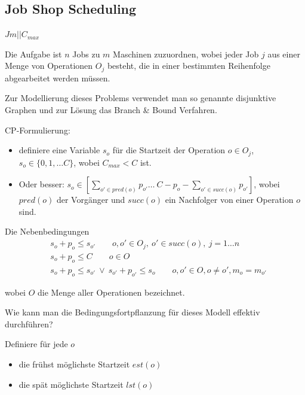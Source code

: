 \documentclass[hyperref={pdfpagelabels=false}]{beamer}
\begin{document}
\subsection{Job Shop Scheduling}
\begin{frame}[allowframebreaks]{$Jm||C_{max}$}
\nocite{CSP}
\small 

\vspace{40pt}
\begin{block}{}
Die Aufgabe ist $n$ Jobs zu $m$ Maschinen zuzuordnen, wobei jeder Job $j$ aus einer Menge von Operationen $O_j$ besteht, die in einer bestimmten Reihenfolge abgearbeitet werden müssen.
\end{block}

\begin{block}{}
Zur Modellierung dieses Problems verwendet man so genannte {\color{darkred}disjunktive Graphen} und
zur Lösung das {\color{darkred}Branch \& Bound} Verfahren.
\end{block}

\newpage

CP-Formulierung:
\begin{itemize}
\item definiere eine Variable $s_o$ für die Startzeit der Operation $o\in O_j$, $s_o\in \{0,1,\dots C\}$, wobei $C_{max}<C$ ist. 
\item Oder besser:  $s_o\in[\sum_{o'\in pred(o)}p_{o'}\dots\ C-p_o-\sum_{o'\in succ(o)}p_{o'}]$, wobei $pred(o)$ der Vorgänger und $succ(o)$ ein Nachfolger von einer Operation $o$ sind.
\end{itemize}

\begin{block}{Die Nebenbedingungen} \begin{align}
 & s_o + p_o \le s_{o'} \qquad  o,o'\in O_j,\ o'\in succ(o),\ j=1\dots n \nonumber \\
 & s_o + p_o \le C \qquad  o\in O \nonumber \\
 & s_o + p_o \le s_{o'}\  \vee\ s_{o'} + p_{o'} \le s_{o} \qquad o,o'\in O, o\not=o', m_o=m_{o'} \nonumber 
\end{align}
\end{block}
wobei $O$ die Menge aller Operationen bezeichnet.


\newpage

Wie kann man die Bedingungsfortpflanzung für dieses Modell effektiv durchführen? 

Definiere für jede $o$ 
\begin{itemize}
\item die frühst möglichste Startzeit $est(o)$
\item die spät möglichste Startzeit $lst(o)$
\end{itemize}


\end{frame}
\end{document}
